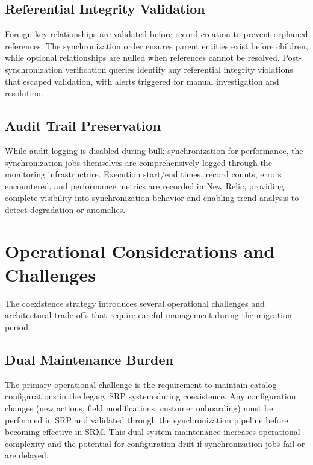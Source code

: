 \subsection{Referential Integrity Validation}

Foreign key relationships are validated before record creation to prevent orphaned references. The synchronization order ensures parent entities exist before children, while optional relationships are nulled when references cannot be resolved. Post-synchronization verification queries identify any referential integrity violations that escaped validation, with alerts triggered for manual investigation and resolution.

\subsection{Audit Trail Preservation}

While audit logging is disabled during bulk synchronization for performance, the synchronization jobs themselves are comprehensively logged through the monitoring infrastructure. Execution start/end times, record counts, errors encountered, and performance metrics are recorded in New Relic, providing complete visibility into synchronization behavior and enabling trend analysis to detect degradation or anomalies.

\section{Operational Considerations and Challenges}

The coexistence strategy introduces several operational challenges and architectural trade-offs that require careful management during the migration period.

\subsection{Dual Maintenance Burden}

The primary operational challenge is the requirement to maintain catalog configurations in the legacy SRP system during coexistence. Any configuration changes (new actions, field modifications, customer onboarding) must be performed in SRP and validated through the synchronization pipeline before becoming effective in SRM. This dual-system maintenance increases operational complexity and the potential for configuration drift if synchronization jobs fail or are delayed.

